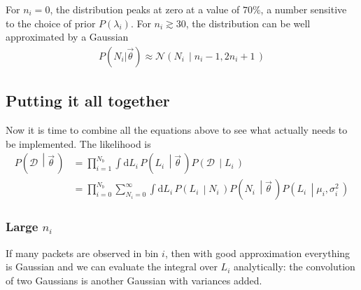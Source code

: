 \documentclass[a4,12pt]{article}
\newcommand{\data}{\ensuremath{\mathcal{D}}}
\newcommand{\given}[2]{\left(#1\, \middle| #2 \, \right)}
\newcommand{\gaussian}{\ensuremath{\mathcal{N}}}
\newcommand{\Lumi}{\ensuremath{L_i}}
\newcommand{\rmdx}[1]{\mbox{d} #1 \,} %
\newcommand{\vecth}{\ensuremath{{\vec{\theta}}}}
\newcommand{\mui}{\mu_i}
\newcommand{\sigi}{\sigma_i^2}
\begin{document}
For $n_i=0$, the distribution peaks at zero at a value of $70\%$, a
number sensitive to the choice of prior $P(\lambda_i)$.  For $n_i \gtrsim 30$, the
distribution can be well approximated by a Gaussian
\begin{align}
  \label{eq:poisson-gauss-approx}
  P(N_i | \vecth) \approx \gaussian \given{N_i}{n_i-1, 2 n_i + 1}
\end{align}

\subsection{Putting it all together}

Now it is time to combine all the equations above to see what actually
needs to be implemented. The likelihood is
\begin{align}
  \label{eq:all-likelihood}
  P\given{\data}{\vecth} &= \prod_{i=1}^{N_b} \int \rmdx{\Lumi} P\given{\Lumi}{\vecth}   P\given{\data}{\Lumi}\\
  &= \prod_{i=0}^{N_b} \sum_{N_i=0}^\infty \int \rmdx{\Lumi} P \given{\Lumi}{N_i}
  P\given{N_i}{\vecth} P\given{\Lumi}{\mui, \sigi}
\end{align}


\subsubsection*{Large $n_i$}

If many packets are observed in bin $i$, then with good approximation
everything is Gaussian and we can evaluate the integral over $\Lumi$
analytically: the convolution of two Gaussians is another Gaussian
with variances added.
\end{document}
